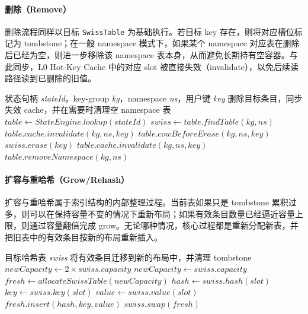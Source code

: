 \documentclass[a4paper,11pt]{article}
\begin{document}
\paragraph{删除（Remove）}

删除流程同样以目标 \texttt{SwissTable} 为基础执行。若目标 key 存在，则将对应槽位标记为 tombstone；在一般 namespace 模式下，如果某个 namespace 对应表在删除后已经为空，则进一步移除该 namespace 表本身，从而避免长期持有空容器。与此同步，L0 Hot-Key Cache 中的对应 slot 被直接失效（invalidate），以免后续读路径读到已删除的旧值。

\begin{algorithm}[!htbp]
\caption{状态删除、L0 cache 失效与空命名空间清理算法}
\footnotesize
\begin{algorithmic}[1]
\Require 状态句柄 \textit{stateId}，key-group \textit{kg}，namespace \textit{ns}，用户键 \textit{key}
\Ensure 删除目标条目，同步失效 cache，并在需要时清理空 namespace 表
\State $table \gets StateEngine.lookup(stateId)$
\State $swiss \gets table.findTable(kg, ns)$
    \State $table.cache.invalidate(kg, ns, key)$
  \EndIf
  \State \Return
\EndIf
{}
  \State $table.cowBeforeErase(kg, ns, key)$
\EndIf
\State $swiss.erase(key)$
  \State $table.cache.invalidate(kg, ns, key)$ 
\EndIf
{}
  \State $table.removeNamespace(kg, ns)$
\EndIf
\end{algorithmic}
\end{algorithm}

\paragraph{扩容与重哈希（Grow/Rehash）}

扩容与重哈希属于索引结构的内部整理过程。当前表如果只是 tombstone 累积过多，则可以在保持容量不变的情况下重新布局；如果有效条目数量已经逼近容量上限，则通过容量翻倍完成 grow。无论哪种情况，核心过程都是重新分配新表，并把旧表中的有效条目按新的布局重新插入。

\begin{algorithm}[!htbp]
\caption{SwissTable 扩容与重哈希算法}
\footnotesize
\begin{algorithmic}[1]
\Require 目标哈希表 \textit{swiss}
\Ensure 将有效条目迁移到新的布局中，并清理 tombstone
  \State $newCapacity \gets 2 \times swiss.capacity$
\Else
  \State $newCapacity \gets swiss.capacity$
\EndIf
\State $fresh \gets allocateSwissTable(newCapacity)$
    \State $hash \gets swiss.hash(slot)$
    \State $key \gets swiss.key(slot)$
    \State $value \gets swiss.value(slot)$
    \State $fresh.insert(hash, key, value)$
  \EndIf
\EndFor
\State $swiss.swap(fresh)$
\end{algorithmic}
\end{algorithm}
\end{document}
